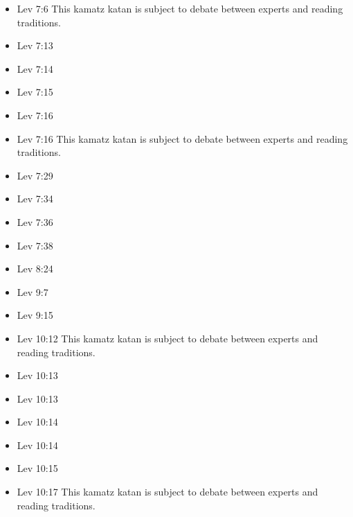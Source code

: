 \documentclass[14pt]{article}
\begin{document}
\begin{multicols}{2}
\begin{itemize}
\item Lev 7:6 This kamatz katan is subject to debate between experts and reading traditions.

\item Lev 7:13

\item Lev 7:14

\item Lev 7:15

\item Lev 7:16

\item Lev 7:16 This kamatz katan is subject to debate between experts and reading traditions.

\item Lev 7:29

\item Lev 7:34

\item Lev 7:36

\item Lev 7:38

\item Lev 8:24

\item Lev 9:7

\item Lev 9:15

\item Lev 10:12 This kamatz katan is subject to debate between experts and reading traditions.

\item Lev 10:13

\item Lev 10:13

\item Lev 10:14

\item Lev 10:14

\item Lev 10:15

\item Lev 10:17 This kamatz katan is subject to debate between experts and reading traditions.


\end{itemize}
\end{multicols}
\end{document}
